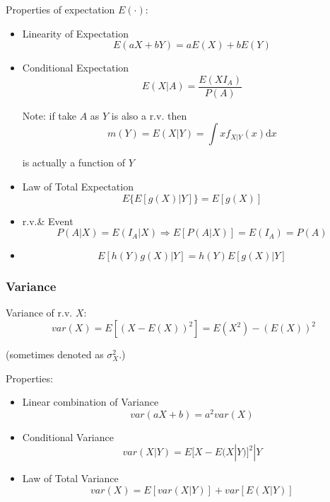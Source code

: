     Properties of expectation $E(\cdot)$:
\begin{itemize}
    \item Linearity of Expectation\begin{equation}
        E(aX+bY)=aE(X)+bE(Y)
    \end{equation}
    \item Conditional Expectation\begin{equation}
        E(X|A)=\frac{E(XI_A)}{P(A)}
    \end{equation}
    
    Note: if take $A$ as $Y$ is also a r.v. then 
    \begin{equation}m(Y)=E(X|Y)=\int xf_{X|Y}(x)\mathrm{d}x\end{equation}

    is actually a function of $Y$

    \item Law of Total Expectation\begin{equation}
    E\{E[g(X)|Y]\}=E[g(X)]
    \end{equation}
    \item r.v.\& Event
    \begin{equation}
        P(A|X)=E(I_A|X)\Rightarrow E[P(A|X)]=E(I_A)=P(A)
    \end{equation}
    \item \begin{equation}
        E[h(Y)g(X)|Y]=h(Y)E[g(X)|Y]
    \end{equation}
\end{itemize}


\subsubsection{Variance}
    Variance of r.v. $X$: 
    \begin{equation}
        var(X)=E[(X-E(X))^2]=E(X^2)-(E(X))^2
    \end{equation}

    (sometimes denoted as $\sigma^2_X$.)

    Properties:
\begin{itemize} 
    \item Linear combination of Variance\begin{equation}
        var(aX+b)=a^2var(X)
    \end{equation}
    \item Conditional Variance
    \begin{equation}
        var(X|Y)=E{[X-E(X|Y)]^2|Y}
    \end{equation}
    \item Law of Total Variance\begin{equation}
        var(X)=E[var(X|Y)]+var[E(X|Y)]
    \end{equation}
\end{itemize}

